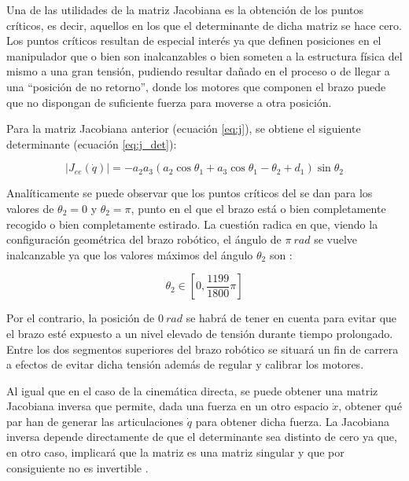 Una de las utilidades de la matriz Jacobiana es la obtención de los puntos críticos,
es decir, aquellos en los que el determinante de dicha matriz se hace cero. Los puntos
críticos resultan de especial interés ya que definen posiciones en el manipulador que o
bien son inalcanzables o bien someten a la estructura física del mismo a una gran tensión,
pudiendo resultar dañado en el proceso o de llegar a una ``posición de no retorno'', donde
los motores que componen el brazo puede que no dispongan de suficiente fuerza para moverse a otra
posición.

Para la matriz Jacobiana anterior (ecuación \ref{eq:j}), se obtiene el siguiente 
determinante (ecuación \ref{eq:j_det}):

\begin{equation}\label{eq:j_det}
    \left|J_{ee}\left(\dot{q}\right)\right| = - a_{2} a_{3} \left(a_{2} \cos{\theta_{1}} + a_{3} \cos{\theta_{1} - \theta_{2}} + d_{1}\right) \sin{\theta_{2}}
\end{equation}

Analíticamente se puede observar que los puntos críticos del \pArm{} se dan para 
los valores de $\theta_2 = 0$ y $\theta_2 = \pi$, punto en el que el brazo está o bien
completamente recogido o bien completamente estirado. La cuestión radica en que, viendo
la configuración geométrica del brazo robótico, el ángulo de $\pi~rad$ se
vuelve inalcanzable ya que los valores máximos del ángulo $\theta_2$ son \cite{UArmDeveloperSwiftProForArduino}:

\begin{equation*}
    \theta_2 \in \left[0, \frac{1199}{1800}\pi\right]
\end{equation*}

Por el contrario, la posición de $0~rad$ se habrá de tener en cuenta para
evitar que el brazo esté expuesto a un nivel elevado de tensión durante tiempo prolongado.
Entre los dos segmentos superiores del brazo robótico se situará un fin de carrera a
efectos de evitar dicha tensión además de regular y calibrar los motores.

Al igual que en el caso de la cinemática directa, se puede obtener una matriz Jacobiana
inversa que permite, dada una fuerza en un otro espacio $\dot{x}$, obtener qué par han
de generar las articulaciones $\dot{q}$ para obtener dicha fuerza. La Jacobiana inversa
depende directamente de que el determinante sea distinto de cero ya que, en otro caso,
implicará que la matriz es una matriz singular y que por consiguiente no es invertible
\cite{InvertibleMatrix2020}.

